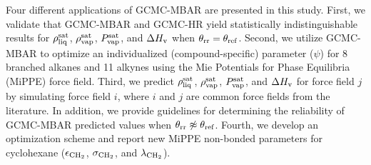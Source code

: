 \documentclass[journal=jced,manuscript=article]{achemso}
\begin{document}



Four different applications of GCMC-MBAR are presented in this study. First, we validate that GCMC-MBAR and GCMC-HR yield statistically indistinguishable results for $\rho_{\rm liq}^{\rm sat}$, $\rho_{\rm vap}^{\rm sat}$, $P_{\rm vap}^{\rm sat}$, and $\Delta H_{\rm v}$ when $\theta_{\rm rr} = \theta_{\rm ref}$. Second, we utilize GCMC-MBAR to optimize an individualized (compound-specific) parameter ($\psi$) for 8 branched alkanes and 11 alkynes using the Mie Potentials for Phase Equilibria (MiPPE) force field. Third, we predict $\rho_{\rm liq}^{\rm sat}$, $\rho_{\rm vap}^{\rm sat}$, $P_{\rm vap}^{\rm sat}$, and $\Delta H_{\rm v}$ for force field $j$ by simulating force field $i$, where $i$ and $j$ are common force fields from the literature. In addition, we provide guidelines for determining the reliability of GCMC-MBAR predicted values when $\theta_{\rm rr} \not\approx \theta_{\rm ref}$. Fourth, we develop an optimization scheme and report new MiPPE non-bonded parameters for cyclohexane ($\epsilon_{\rm CH_2}$, $\sigma_{\rm CH_2}$, and $\lambda_{\rm CH_2}$).   
\end{document}
